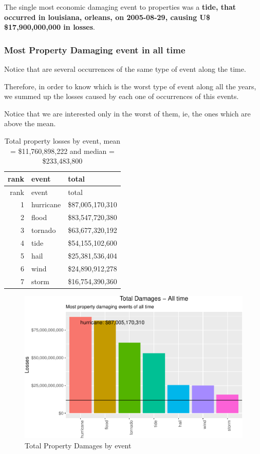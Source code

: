 \documentclass[]{article}
\begin{document}
The single most economic damaging event to properties was a
\textbf{tide, that occurred in louisiana, orleans, on 2005-08-29,
causing U\$ \$17,900,000,000 in losses}.

\subsubsection{Most Property Damaging event in all
time}\label{most-property-damaging-event-in-all-time}

Notice that are several occurrences of the same type of event along the
time.

Therefore, in order to know which is the worst type of event along all
the years, we summed up the losses caused by each one of occurrences of
this events.

Notice that we are interested only in the worst of them, ie, the ones
which are above the mean.

\begin{longtable}[]{@{}rll@{}}
\caption{Total property losses by event, mean = \$11,760,898,222 and
median = \$233,483,800}\tabularnewline
\toprule
rank & event & total\tabularnewline
\midrule
\endfirsthead
\toprule
rank & event & total\tabularnewline
\midrule
\endhead
1 & hurricane & \$87,005,170,310\tabularnewline
2 & flood & \$83,547,720,380\tabularnewline
3 & tornado & \$63,677,320,192\tabularnewline
4 & tide & \$54,155,102,600\tabularnewline
5 & hail & \$25,381,536,404\tabularnewline
6 & wind & \$24,890,912,278\tabularnewline
7 & storm & \$16,754,390,360\tabularnewline
\bottomrule
\end{longtable}

\begin{figure}[htbp]
\centering
\includegraphics{readme_files/figure-latex/prop-all-plot-1.pdf}
\caption{Total Property Damages by event}
\end{figure}
\end{document}
